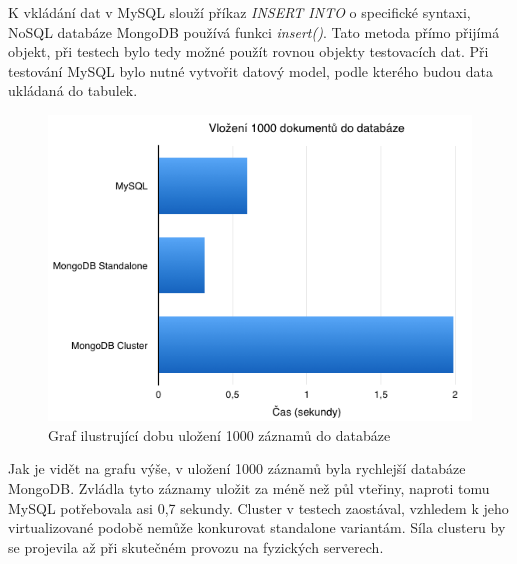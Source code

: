 K vkládání dat v MySQL slouží příkaz \emph{INSERT INTO} o specifické syntaxi, NoSQL databáze MongoDB používá funkci \emph{insert()}. Tato metoda přímo přijímá objekt, při testech bylo tedy možné použít rovnou objekty testovacích dat. Při testování MySQL bylo nutné vytvořit datový model, podle kterého budou data ukládaná do tabulek.
\begin{figure}[h]
\begin{centering}
\includegraphics[scale=0.5]{obrazky/grafy/insert1000}
\par\end{centering}
\caption{Graf ilustrující dobu uložení 1000 záznamů do databáze}
\end{figure}

Jak je vidět na grafu výše, v uložení 1000 záznamů byla rychlejší databáze MongoDB. Zvládla tyto záznamy uložit za méně než půl vteřiny, naproti tomu MySQL potřebovala asi 0,7 sekundy. Cluster v testech zaostával, vzhledem k jeho virtualizované podobě nemůže konkurovat standalone variantám. Síla clusteru by se projevila až při skutečném provozu na fyzických serverech.

